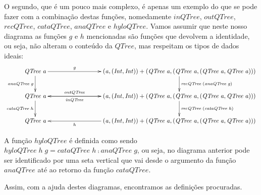 \documentclass[a4paper]{article}
\newcommand{\Conid}[1]{\mathit{#1}}
\newcommand{\Varid}[1]{\mathit{#1}}
\begin{document}
\vspace{0.4cm}

O segundo, que é um pouco mais complexo, é apenas um exemplo do que se pode
fazer com a combinação destas funções, nomedamente \ensuremath{\Varid{inQTree}}, \ensuremath{\Varid{outQTree}},
\ensuremath{\Varid{recQTree}}, \ensuremath{\Varid{cataQTree}}, \ensuremath{\Varid{anaQTree}} e \ensuremath{\Varid{hyloQTree}}. Vamos assumir que neste nosso diagrama
as funções \ensuremath{\Varid{g}} e \ensuremath{\Varid{h}} mencionadas são funções que devolvem a identidade, ou seja,
não alteram o conteúdo da \ensuremath{\Conid{QTree}}, mas respeitam os tipos de dados ideais:
\begin{eqnarray*}
\xymatrix@C=3cm{
   \ensuremath{\Conid{QTree}\;\Varid{a}}
          \ar[d]_-{\ensuremath{\Varid{anaQTree}\;\Varid{g}}}
           \ar[r]^-{\ensuremath{\Varid{g}}}
&
    \ensuremath{(\Varid{a},(\Conid{Int},\Conid{Int}))+(\Conid{QTree}\;\Varid{a},(\Conid{QTree}\;\Varid{a},(\Conid{QTree}\;\Varid{a},\Conid{QTree}\;\Varid{a})))}
          \ar[d]^{\ensuremath{\Varid{recQTree}\;(\Varid{anaQTree}\;\Varid{g})}}
\\
    \ensuremath{\Conid{QTree}\;\Varid{a}}
       \ar[d]_-{\ensuremath{\Varid{cataQTree}\;\Varid{h}}}
       \ar[r]^-{\ensuremath{\Varid{outQTree}}}
&
    \ensuremath{(\Varid{a},(\Conid{Int},\Conid{Int}))+(\Conid{QTree}\;\Varid{a},(\Conid{QTree}\;\Varid{a},(\Conid{QTree}\;\Varid{a},\Conid{QTree}\;\Varid{a})))}
          \ar[l]^-{\ensuremath{\Varid{inQTree}}}
           \ar[d]^{\ensuremath{\Varid{recQTree}\;(\Varid{cataQTree}\;\Varid{h})}}
\\
   \ensuremath{\Conid{QTree}\;\Varid{a}}
&
   \ensuremath{(\Varid{a},(\Conid{Int},\Conid{Int}))+(\Conid{QTree}\;\Varid{a},(\Conid{QTree}\;\Varid{a},(\Conid{QTree}\;\Varid{a},\Conid{QTree}\;\Varid{a})))}
       \ar[l]^-{\ensuremath{\Varid{h}}}
}
\end{eqnarray*}

A função \ensuremath{\Varid{hyloQTree}} é definida como sendo \ensuremath{\Varid{hyloQTree}\;\Varid{h}\;\Varid{g}\mathrel{=}\Varid{cataQTree}\;\Varid{h}\comp \Varid{anaQTree}\;\Varid{g}},
ou seja, no diagrama anterior pode ser identificado por uma seta vertical que vai desde o
argumento da função \ensuremath{\Varid{anaQTree}} até ao retorno da função \ensuremath{\Varid{cataQTree}}.

Assim, com a ajuda destes diagramas, encontramos as definições procuradas.

\vspace{0.5cm}
\end{document}
